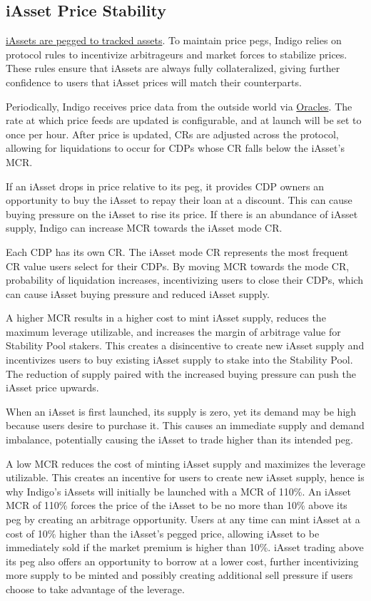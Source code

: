\documentclass{article}
\begin{document}
\begin{sloppypar}
\hypertarget{iasset-price-stability}{%
\subsection{iAsset Price Stability}\label{iasset-price-stability}}

\protect\hyperlink{synthetic-assets}{iAssets are pegged to tracked
assets}. To maintain price pegs, Indigo relies on protocol rules to
incentivize arbitrageurs and market forces to stabilize prices. These
rules ensure that iAssets are always fully collateralized, giving
further confidence to users that iAsset prices will match their
counterparts.

Periodically, Indigo receives price data from the outside world via
\protect\hyperlink{oracles}{Oracles}. The rate at which price feeds are
updated is configurable, and at launch will be set to once per hour.
After price is updated, CRs are adjusted across the protocol, allowing
for liquidations to occur for CDPs whose CR falls below the iAsset's
MCR.

If an iAsset drops in price relative to its peg, it provides CDP owners
an opportunity to buy the iAsset to repay their loan at a discount. This
can cause buying pressure on the iAsset to rise its price. If there is
an abundance of iAsset supply, Indigo can increase MCR towards the
iAsset mode CR.

Each CDP has its own CR. The iAsset mode CR represents the most frequent
CR value users select for their CDPs. By moving MCR towards the mode CR,
probability of liquidation increases, incentivizing users to close their
CDPs, which can cause iAsset buying pressure and reduced iAsset supply.

A higher MCR results in a higher cost to mint iAsset supply, reduces the
maximum leverage utilizable, and increases the margin of arbitrage value
for Stability Pool stakers. This creates a disincentive to create new
iAsset supply and incentivizes users to buy existing iAsset supply to
stake into the Stability Pool. The reduction of supply paired with the
increased buying pressure can push the iAsset price upwards.

When an iAsset is first launched, its supply is zero, yet its demand may
be high because users desire to purchase it. This causes an immediate
supply and demand imbalance, potentially causing the iAsset to trade
higher than its intended peg.

A low MCR reduces the cost of minting iAsset supply and maximizes the
leverage utilizable. This creates an incentive for users to create new
iAsset supply, hence is why Indigo's iAssets will initially be launched
with a MCR of 110\%. An iAsset MCR of 110\% forces the price of the
iAsset to be no more than 10\% above its peg by creating an arbitrage
opportunity. Users at any time can mint iAsset at a cost of 10\% higher
than the iAsset's pegged price, allowing iAsset to be immediately sold
if the market premium is higher than 10\%. iAsset trading above its peg
also offers an opportunity to borrow at a lower cost, further
incentivizing more supply to be minted and possibly creating additional
sell pressure if users choose to take advantage of the leverage.


\end{sloppypar}
\end{document}
